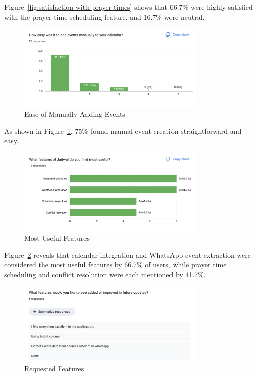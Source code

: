 Figure~\ref{fig:satisfaction-with-prayer-times} shows that 66.7\% were highly satisfied with the prayer time scheduling feature, and 16.7\% were neutral.

\begin{figure}[H]
\centering
\includegraphics[width=0.8\textwidth]{images/end-survey/10-ease-of-adding-events-manually.png}
\caption{Ease of Manually Adding Events}
\label{fig:ease-of-adding-events-manually}
\end{figure}

As shown in Figure~\ref{fig:ease-of-adding-events-manually}, 75\% found manual event creation straightforward and easy.

\begin{figure}[H]
\centering
\includegraphics[width=0.8\textwidth]{images/end-survey/11-most-useful-feature.png}
\caption{Most Useful Features}
\label{fig:most-useful-feature}
\end{figure}

Figure~\ref{fig:most-useful-feature} reveals that calendar integration and WhatsApp event extraction were considered the most useful features by 66.7\% of users, while prayer time scheduling and conflict resolution were each mentioned by 41.7\%.

\begin{figure}[H]
\centering
\includegraphics[width=0.8\textwidth]{images/end-survey/12-features-you-like-be-added.png}
\caption{Requested Features}
\label{fig:features-you-like-be-added}
\end{figure}


